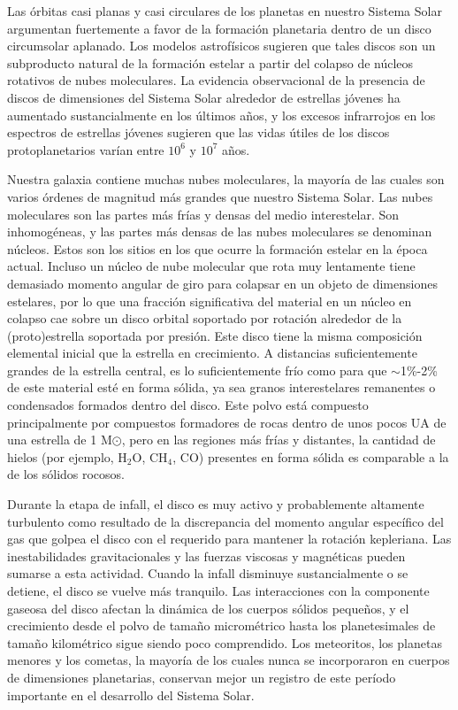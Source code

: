 \documentclass[12pt]{article}
\begin{document}
Las órbitas casi planas y casi circulares de los planetas en nuestro Sistema Solar argumentan 
fuertemente a favor de la formación planetaria dentro de un disco circumsolar aplanado. Los modelos
astrofísicos sugieren que tales discos son un subproducto natural de la formación estelar a partir 
del colapso de núcleos rotativos de nubes moleculares. La evidencia observacional de la presencia
de discos de dimensiones del Sistema Solar alrededor de estrellas jóvenes ha aumentado sustancialmente 
en los últimos años, y los excesos infrarrojos en los espectros de estrellas jóvenes sugieren
que las vidas útiles de los discos protoplanetarios varían entre $10^6$ y $10^7$ años.

Nuestra galaxia contiene muchas nubes moleculares, la mayoría de las cuales son varios órdenes de 
magnitud más grandes que nuestro Sistema Solar. Las nubes moleculares son las partes más frías y
densas del medio interestelar. Son inhomogéneas, y las partes más densas de las nubes moleculares se 
denominan núcleos. Estos son los sitios en los que ocurre la formación estelar en la época actual.
Incluso un núcleo de nube molecular que rota muy lentamente tiene demasiado momento angular de giro 
para colapsar en un objeto de dimensiones estelares, por lo que una fracción significativa del
material en un núcleo en colapso cae sobre un disco orbital soportado por rotación alrededor de la 
(proto)estrella soportada por presión. Este disco tiene la misma composición elemental inicial que
la estrella en crecimiento. A distancias suficientemente grandes de la estrella central, es lo 
suficientemente frío como para que $\sim$1\%-2\% de este material esté en forma sólida, ya sea granos
interestelares remanentes o condensados formados dentro del disco. Este polvo está compuesto 
principalmente por compuestos formadores de rocas dentro de unos pocos UA de una estrella de 
1 M$\odot$, pero en las regiones más frías y distantes, la cantidad de hielos (por ejemplo, H$_2$O, 
CH$_4$, CO) presentes en forma sólida es comparable a la de los sólidos rocosos.

Durante la etapa de infall, el disco es muy activo y probablemente altamente turbulento como resultado 
de la discrepancia del momento angular específico del gas que golpea el disco con el requerido para
mantener la rotación kepleriana. Las inestabilidades gravitacionales y las fuerzas viscosas y magnéticas 
pueden sumarse a esta actividad. Cuando la infall disminuye sustancialmente o se detiene, el disco se
vuelve más tranquilo. Las interacciones con la componente gaseosa del disco afectan la dinámica de los 
cuerpos sólidos pequeños, y el crecimiento desde el polvo de tamaño micrométrico hasta los
planetesimales de tamaño kilométrico sigue siendo poco comprendido. Los meteoritos, los planetas menores 
y los cometas, la mayoría de los cuales nunca se incorporaron en cuerpos de dimensiones planetarias, 
conservan mejor un registro de este período importante en el desarrollo del Sistema Solar.
\end{document}
